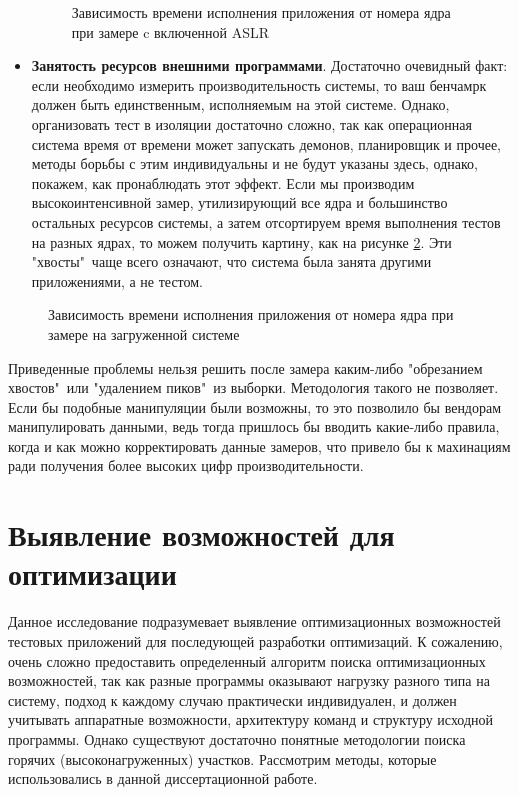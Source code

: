 \begin{itemize}
	\begin{figure}[ht]
		\caption{Зависимость времени исполнения приложения от номера ядра при замере c включенной ASLR}\label{fig:peaks}
	\end{figure}
	\item \textbf{Занятость ресурсов внешними программами}. Достаточно очевидный факт: если необходимо измерить производительность системы, то ваш бенчамрк должен быть единственным, исполняемым на этой системе.  Однако, организовать тест в изоляции достаточно сложно, так как операционная система время от времени может запускать демонов, планировщик и прочее,  методы борьбы с этим индивидуальны и не будут указаны здесь, однако, покажем, как пронаблюдать этот эффект. Если мы производим высокоинтенсивной замер, утилизирующий все ядра и большинство остальных ресурсов системы, а затем отсортируем время выполнения тестов на разных ядрах, то можем получить картину, как на рисунке \ref{fig:tails}. Эти "хвосты"\  чаще всего означают, что система была занята другими  приложениями, а не  тестом.
\end{itemize}


\begin{figure}[ht]
	\caption{Зависимость времени исполнения приложения от номера ядра при замере на загруженной системе}\label{fig:tails}
\end{figure}



Приведенные проблемы нельзя решить после замера каким-либо "обрезанием хвостов"\  или "удалением пиков"\  из выборки. Методология такого не позволяет. Если бы подобные манипуляции были возможны, то это позволило бы вендорам манипулировать данными, ведь тогда пришлось бы вводить какие-либо правила, когда и как можно корректировать данные замеров, что привело бы к махинациям ради получения более высоких цифр производительности.

\section {Выявление возможностей для оптимизации}\label{p1:optop}
Данное исследование подразумевает выявление оптимизационных возможностей тестовых приложений для последующей разработки оптимизаций. К сожалению, очень сложно предоставить определенный алгоритм поиска оптимизационных возможностей, так как разные программы оказывают нагрузку разного типа на систему, подход к каждому случаю практически индивидуален, и должен учитывать аппаратные возможности, архитектуру команд и структуру исходной программы. Однако существуют достаточно понятные методологии поиска горячих (высоконагруженных) участков. Рассмотрим методы, которые использовались в данной диссертационной работе.

